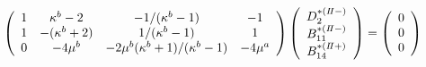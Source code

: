 \begin{align}
	\left(
	\begin{array}{cccc}
		1& \kappa^b-2 & -1/(\kappa^b-1) & -1 \\
		1 & -(\kappa^b+2) & 1/(\kappa^b-1) & 1 \\
		0 & -4\mu^{b} & -2\mu^{b}(\kappa^b+1)/(\kappa^b-1) & -4\mu^{a} \\
	\end{array}
	\right)
	\left(
	\begin{array}{c}
		D_{2}^{*(I\hspace{-.15em}I-)} \\
	 	B_{11}^{*(I\hspace{-.15em}I-)} \\
	 	B_{14}^{*(I\hspace{-.15em}I+)} \\
	\end{array}
	\right)
	=
	\left(
	\begin{array}{c}
		0 \\
	 	0 \\
	 	0 \\
	\end{array}
	\right)
\end{align}
\newpage

